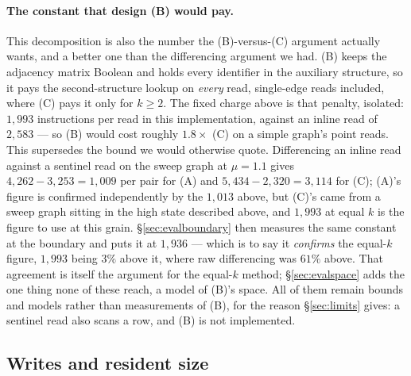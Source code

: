 \documentclass[11pt,a4paper]{article}
\theoremstyle{plain}
\theoremstyle{definition}
\theoremstyle{remark}
\begin{document}
\paragraph{The constant that design (B) would pay.} This decomposition is also the
number the (B)-versus-(C) argument actually wants, and a better one than the
differencing argument we had. (B) keeps the adjacency matrix Boolean and holds
every identifier in the auxiliary structure, so it pays the second-structure
lookup on \emph{every} read, single-edge reads included, where (C) pays it only
for $k \ge 2$. The fixed charge above is that penalty, isolated: $1{,}993$
instructions per read in this implementation, against an inline read of
$2{,}583$ --- so (B) would cost roughly $1.8\times$ (C) on a simple graph's
point reads. This supersedes the bound we would otherwise quote. Differencing an
inline read against a sentinel read on the sweep graph at $\mu = 1.1$ gives
$4{,}262 - 3{,}253 = 1{,}009$ per pair for (A) and $5{,}434 - 2{,}320 = 3{,}114$
for (C); (A)'s figure is confirmed independently by the $1{,}013$ above, but
(C)'s came from a sweep graph sitting in the high state described above, and
$1{,}993$ at equal $k$ is the figure to use at this grain.
\S\ref{sec:evalboundary} then measures the same constant at the boundary and
puts it at $1{,}936$ --- which is to say it \emph{confirms} the equal-$k$
figure, $1{,}993$ being $3\%$ above it, where raw differencing was $61\%$ above.
That agreement is itself the argument for the equal-$k$ method;
\S\ref{sec:evalspace} adds the one thing
none of these reach, a model of (B)'s space. All of them remain bounds and
models rather than measurements of (B), for the reason \S\ref{sec:limits}
gives: a sentinel read also scans a row, and (B) is not implemented.

\subsection{Writes and resident size}
\label{sec:evalwrite}
\end{document}
